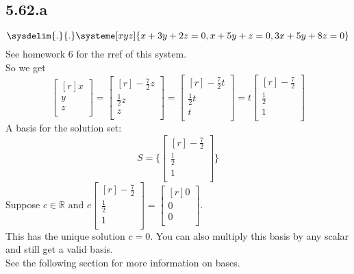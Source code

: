 \documentclass{report}
\theoremstyle{plain}
\theoremstyle{definition}
\theoremstyle{plain}
\begin{document}
\subsection{5.62.a}
\[ \sysdelim{.}{.}\systeme[xyz]{x+3y+2z=0,x+5y+z=0,3x+5y+8z=0} \]
See homework 6 for the rref of this system.\\
So we get
\[ \begin{bmatrix}[r]x\\y\\z\\\end{bmatrix}=\begin{bmatrix}[r]-\frac{7}{2}z\\\frac{1}{2}z\\z\\\end{bmatrix}=\begin{bmatrix}[r]-\frac{7}{2}t\\\frac{1}{2}t\\t\\\end{bmatrix}=t\begin{bmatrix}[r]-\frac{7}{2}\\\frac{1}{2}\\1\\\end{bmatrix} \]
A basis for the solution set:
\[ S=\{\begin{bmatrix}[r]-\frac{7}{2}\\\frac{1}{2}\\1\\\end{bmatrix}\} \]
Suppose $c\in\mathbb{R}$ and $c\begin{bmatrix}[r]-\frac{7}{2}\\ \frac{1}{2}\\1\\\end{bmatrix} = \begin{bmatrix}[r]0\\0\\0\\\end{bmatrix}$.\\
This has the unique solution $c=0$.
You can also multiply this basis by any scalar and still get a valid basis.\\
See the following section for more information on bases.
\end{document}
